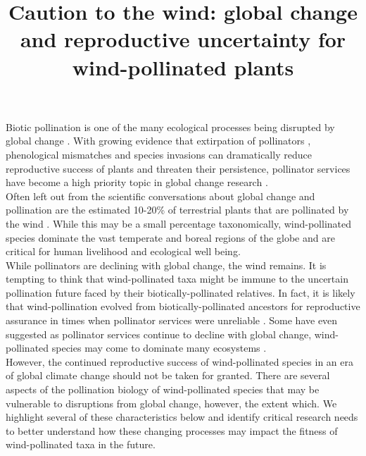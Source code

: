 \documentclass[11pt]{article}
\title{Caution to the wind: global change and reproductive uncertainty for wind-pollinated plants}
\begin{document}
\maketitle


\noindent Biotic pollination is one of the many ecological processes being disrupted by global change \citep{Gerard:2020aa}. With growing evidence that extirpation of pollinators \citep{Burkle:2013aa}, phenological mismatches \citep{Memmott2007} and species invasions \citep{Dietzsch:2011aa} can dramatically reduce reproductive success of plants and threaten their persistence, pollinator services have become a high priority topic in global change research \citep{Dicks975,Kremen:2000aa}.\\

\noindent Often left out from the scientific conversations about global change and pollination are the estimated 10-20\% of terrestrial plants that are pollinated by the wind \citep{Ollerton:2011aa,Friedman:2009aa,Ackerman:2000aa}. While this may be a small percentage taxonomically, wind-pollinated species dominate the vast temperate and boreal regions of the globe \citep{Regal:1982aa} and are critical for human livelihood and ecological well being.\\

\noindent While pollinators are declining with global change, the wind remains. %
It is tempting to think that wind-pollinated taxa might be immune to the uncertain pollination future faced by their biotically-pollinated relatives. In fact, it is likely that wind-pollination evolved from biotically-pollinated ancestors for reproductive assurance in times when pollinator services were unreliable \citep{Friedman:2009aa}. Some have even suggested as pollinator services continue to decline with global change, wind-pollinated species may come to dominate many ecosystems \citep{Bond:1995aa,Hoiss:2013aa}.\\

\noindent However, the continued reproductive success of wind-pollinated species in an era of global climate change should not be taken for granted. There are several aspects of the pollination biology of wind-pollinated species that may be vulnerable to disruptions from global change, however, the extent which. We highlight several of these characteristics below and identify critical research needs to better understand how these changing processes may impact the fitness of wind-pollinated taxa in the future.\\
\end{document}
